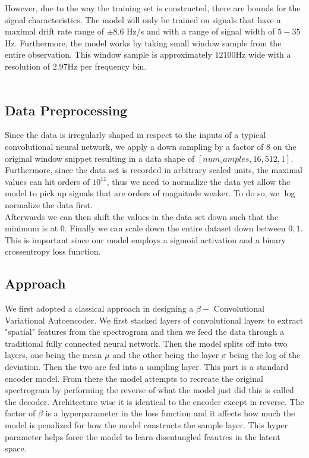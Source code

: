 \documentclass{article}
\begin{document}
However, due to the way the training set is constructed, there are bounds for the signal characteristics. The model will only be trained on signals that have a maximal drift rate range of $\pm 8.6$ Hz/s and with a range of signal width of $5-35$Hz. Furthermore, the model works by taking small window sample from the entire observation. This window sample is approximately $12100$Hz wide with a resolution of $2.97$Hz per frequency bin.\\

\\
\subsection{Data Preprocessing}
Since the data is irregularly shaped in respect to the inputs of a typical convolutional neural network, we apply a down sampling by a factor of 8 on the original window snippet resulting in a data shape of $[num_samples, 16,512,1]$. \\

Furthermore, since the data set is recorded in arbitrary scaled units, the maximal values can hit orders of $10^11$, thus we need to normalize the data yet allow the model to pick up signals that are orders of magnitude weaker. To do so, we $\log$ normalize the data first. \\

Afterwards we can then shift the values in the data set down such that the minimum is at 0. Finally we can scale down the entire dataset down between $0,1$. This is important since our model employs a sigmoid activation and a binary crossentropy loss function. 

\subsection{Approach}
We first adopted a classical approach in designing a $\beta-$ Convolutional Variational Autoencoder. We first stacked layers of convolutional layers to extract "spatial" features from the spectrogram and then we feed the data through a traditional fully connected neural network. Then the model splits off into two layers, one being the mean $\mu$ and the other being the layer 
$\sigma$ being the log of the deviation. Then the two are fed into a sampling layer. This part is a standard encoder model. 
From there the model attempts to recreate the original spectrogram by performing the reverse of what the model just did this is called the decoder. Architecture wise it is identical to the encoder except in reverse. The factor of $\beta$ is a hyperparameter in the loss function and it affects how much the model is penalized for how the model constructs the sample layer. This hyper parameter helps force the model to learn disentangled feautres in the latent space. \\
\end{document}
